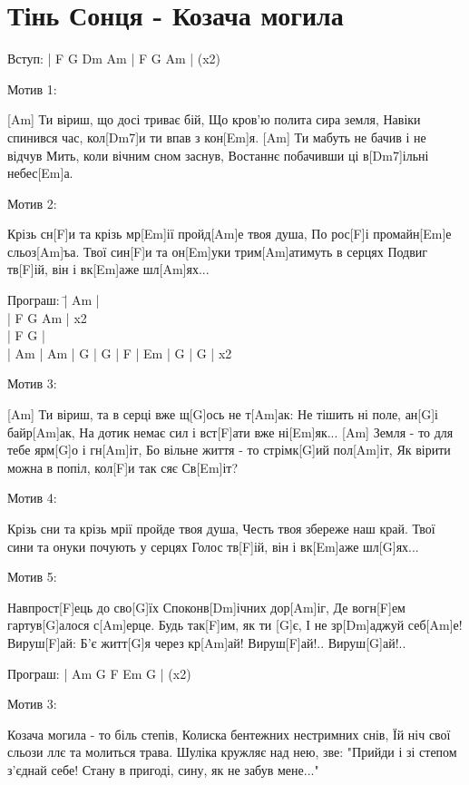 \section{Тінь Сонця - Козача могила}
\begin{guitar}
\begin{flushleft}
    Вступ: | F G Dm Am | F G Am | (x2)

Мотив 1:

[Am] Ти віриш, що досі триває бій,
Що кров'ю полита сира земля,
Навіки спинився час, кол[Dm7]и ти впав з кон[Em]я.
[Am] Ти мабуть не бачив і не відчув
Мить, коли вічним сном заснув,
Востаннє побачивши ці в[Dm7]ільні небес[Em]а.

Мотив 2:

Крізь сн[F]и та крізь мр[Em]ії пройд[Am]е твоя душа,
По рос[F]і промайн[Em]е сльоз[Am]ъа.
Твої син[F]и та он[Em]уки трим[Am]атимуть в серцях
Подвиг тв[F]ій, він і вк[Em]аже шл[Am]ях...

\begin{tabbing}
Програш: \=| Am |\\
         \>| F G Am | x2\\
         \>| F G |\\
         \>| Am | Am | G | G | F | Em | G | G | x2\\
\end{tabbing}

Мотив 3:

[Am] Ти віриш, та в серці вже щ[G]ось не т[Am]ак:
Не тішить ні поле, ан[G]і байр[Am]ак,
На дотик немає сил і вст[F]ати вже ні[Em]як...
[Am] Земля - то для тебе ярм[G]о і гн[Am]іт,
Бо вільне життя - то стрімк[G]ий пол[Am]іт,
Як вірити можна в попіл, кол[F]и так сяє Св[Em]іт?

Мотив 4:

Крізь сни та крізь мрії пройде твоя душа,
Честь твоя збереже наш край.
Твої сини та онуки почують у серцях
Голос тв[F]ій, він і вк[Em]аже шл[G]ях...

Мотив 5:

Навпрост[F]ець до сво[G]їх
Споконв[Dm]ічних дор[Am]іг,
Де вогн[F]ем гартув[G]алося с[Am]ерце.
Будь так[F]им, як ти [G]є,
І не зр[Dm]аджуй себ[Am]е!
Вируш[F]ай:
Б'є житт[G]я через кр[Am]ай!
Вируш[F]ай!.. Вируш[G]ай!..

Програш: | Am G F Em G | (x2)

Мотив 3:

Козача могила - то біль степів,
Колиска бентежних нестримних снів,
Їй ніч свої сльози ллє та молиться трава.
Шуліка кружляє над нею, зве:
"Прийди і зі степом з'єднай себе!
Стану в пригоді, сину, як не забув мене..."


\end{flushleft}
\end{guitar}
